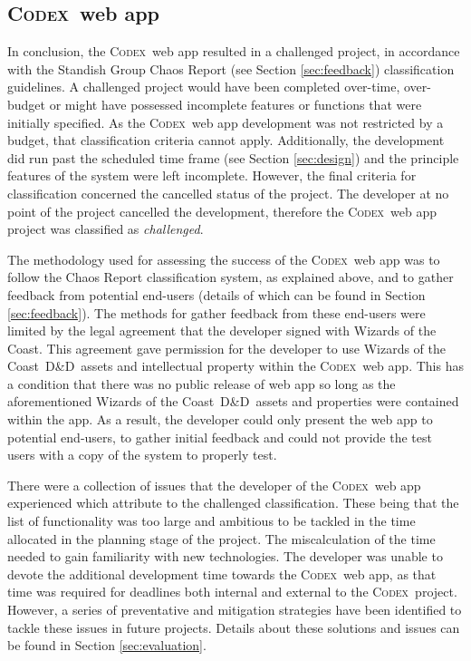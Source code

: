 \documentclass[final]{cmpreport}
\newcommand{\WotC}{Wizards of the Coast}
\newcommand{\dnd}{D\&D}
\newcommand{\Codex}{\textsc{Codex}}
\begin{document}
		\subsection{\Codex \ web app} \label{sec:codex-conc}
		In conclusion, the \Codex \ web app resulted in a challenged project, in accordance with the Standish Group Chaos Report (see Section \ref{sec:feedback}) classification guidelines.  A challenged project would have been completed over-time, over-budget or might have possessed incomplete features or functions that were initially specified. As the \Codex\ web app development was not restricted by a budget, that classification criteria cannot apply. Additionally, the development did run past the scheduled time frame (see Section \ref{sec:design}) and  the principle features of the system were left incomplete. However, the final criteria for classification concerned the cancelled status of the project. The developer at no point of the project cancelled the development, therefore the \Codex \ web app project was classified as \emph{challenged}.
		
		The methodology used for assessing the success of the \Codex \ web app was to follow the Chaos Report classification system, as explained above, and to gather feedback from potential end-users (details of which can be found in Section \ref{sec:feedback}). The methods for gather feedback from these end-users were limited by the legal agreement that the developer signed with \WotC. This agreement gave permission for the developer to use \WotC \ \dnd \ assets and intellectual property within the \Codex \ web app. This has a condition that there was no public release of web app so long as the aforementioned \WotC \ \dnd \ assets and properties were contained within the app. As a result, the developer could only present the web app to potential end-users, to gather initial feedback and could not provide the test users with a copy of the system to properly test.
		
		There were a collection of issues that the developer of the \Codex \ web app experienced which attribute to the challenged classification. These being that the list of functionality was too large and ambitious to be tackled in the time allocated in the planning stage of the project. The miscalculation of the time needed to gain familiarity with new technologies. The developer was unable to devote the additional development time towards the \Codex \ web app, as that time was required for deadlines both internal and external to the \Codex \ project. However, a series of preventative and mitigation strategies have been identified to tackle these issues in future projects. Details about these solutions and issues can be found in Section \ref{sec:evaluation}.
		
\end{document}
